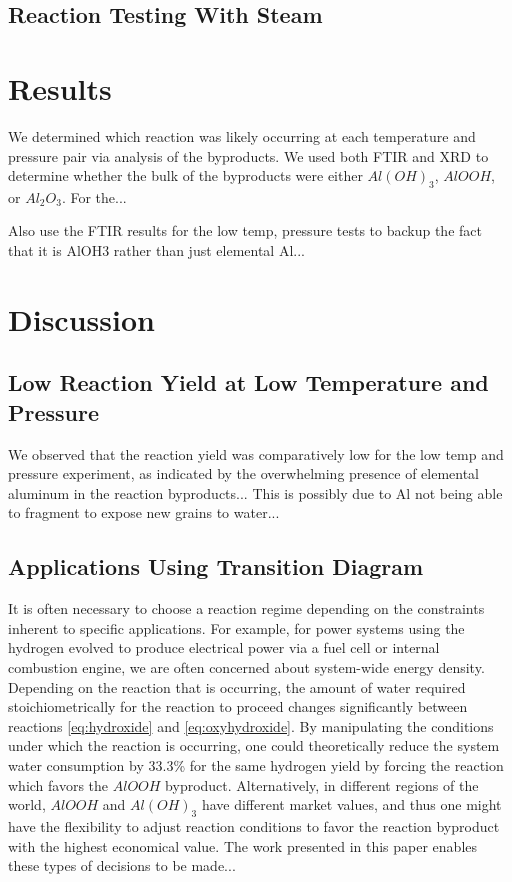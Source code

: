 \documentclass[preprint,12pt,3p]{elsarticle}
\begin{document}
\subsection{Reaction Testing With Steam}

\section{Results}
\label{results}

We determined which reaction was likely occurring at each temperature and
pressure pair via analysis of the byproducts. We used both FTIR and XRD to
determine whether the bulk of the byproducts were either $Al(OH)_3$, $AlOOH$, or
$Al_2O_3$. For the...

Also use the FTIR results for the low temp, pressure tests to backup the fact
that it is AlOH3 rather than just elemental Al...

\section{Discussion}
\label{discussion}

\subsection{Low Reaction Yield at Low Temperature and Pressure}

We observed that the reaction yield was comparatively low for the low temp and
pressure experiment, as indicated by the overwhelming presence of elemental
aluminum in the reaction byproducts... This is possibly due to Al not being able
to fragment to expose new grains to water...
 
\subsection{Applications Using Transition Diagram}

It is often necessary to choose a reaction regime depending on the constraints
inherent to specific applications. For example, for power systems using the
hydrogen evolved to produce electrical power via a fuel cell or internal
combustion engine, we are often concerned about system-wide energy density.
Depending on the reaction that is occurring, the amount of water required
stoichiometrically for the reaction to proceed changes significantly between
reactions \ref{eq:hydroxide} and \ref{eq:oxyhydroxide}. By manipulating the
conditions under which the reaction is occurring, one could theoretically reduce
the system water consumption by 33.3\% for the same hydrogen yield by forcing
the reaction which favors the $AlOOH$ byproduct. Alternatively, in different
regions of the world, $AlOOH$ and $Al(OH)_3$ have different market values, and
thus one might have the flexibility to adjust reaction conditions to favor the
reaction byproduct with the highest economical value. The work presented in this
paper enables these types of decisions to be made...
\end{document}
